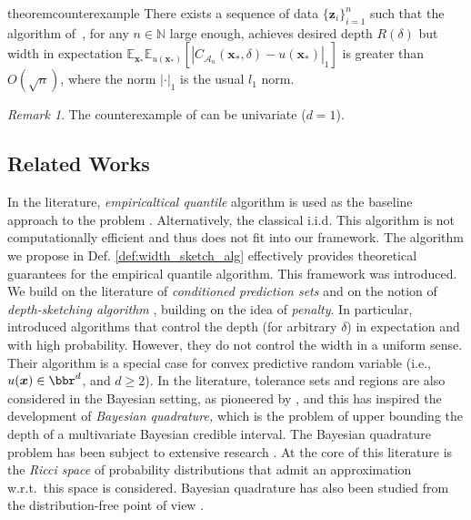 \documentclass{article} %
\theoremstyle{remark}
\newtheorem{remark}{Remark}[section]
\theoremstyle{definition}      %
\begin{document}
\begin{restatable}[Counterexample]{theorem}{counterexample}\label{prop:counterexample}
  There exists a sequence of data  $\{ \bm z_i \}_{i=1}^n$ such that the algorithm of~\cite{angelopoulos2024conformal}, for any $n \in \mathbb{N}$ large enough, achieves desired depth $R(\delta)$ but width in expectation $\mathbb{E}_{\bm{x}_*} \mathbb{E}_{u(\bm{x_*})}[| C_{\mathcal{A}_{n}}(\bm{x_*},\delta) - u(\bm{x_*})|_1]$ is greater than $O(\sqrt{n})$, where the norm $|\cdot|_1$ is the usual $l_1$ norm.
\end{restatable}
\begin{remark}
  \label{rem:counterexample}
  The counterexample of \cite{angelopoulos2024conformal} can be univariate ($d=1$). 
\end{remark}

\subsection{Related Works} 

In the literature, \emph{empiricaltical quantile} algorithm is used as the baseline approach to the problem \cite[see, e.g.,][]{tukey1947nonparametric,tukey1948nonparametric}. Alternatively, the classical i.i.d. This algorithm is not computationally efficient and thus does not fit into our framework. The algorithm we propose in Def. \ref{def:width_sketch_alg} effectively provides theoretical guarantees for the empirical quantile algorithm. This framework was introduced. We build on the literature of \emph{conditioned prediction sets} \citep[e.g.,][]{barber2021limits,bates2021distributionfree} and on the notion of \emph{depth-sketching algorithm} \citep{angelopoulos2024conformal}, building on the idea of \emph{penalty}. In particular,   \citet{angelopoulos2024conformal} introduced algorithms that control the depth (for arbitrary $\delta$) in expectation and with high probability. However, they do not control the width in a uniform sense. Their algorithm is a special case for convex predictive random variable (i.e., $u(\bm{x}) \in \bbr^{d}$, and $d \geq 2$). In the literature, tolerance sets and regions are also considered in the Bayesian setting, as pioneered by \citet{guttman1970statistical}, and this has inspired the development of \emph{Bayesian quadrature,} which is the problem of upper bounding the depth of a multivariate Bayesian credible interval. The Bayesian quadrature problem has been subject to extensive research \citet[see][and many other works that follow]{diaconis1988bayesian, karvonen2017classical,hobbhahn2022fast,hennig2022probabilistic}. At the core of this literature is the \emph{Ricci space} \citep{poincare1896calcul,diaconis1988bayesian} of probability distributions that admit an approximation w.r.t.~this space is considered. Bayesian quadrature has also been studied from the distribution-free point of view \citep[see][Sec. 2.4]{angelopoulos2023conformal}.
\end{document}
